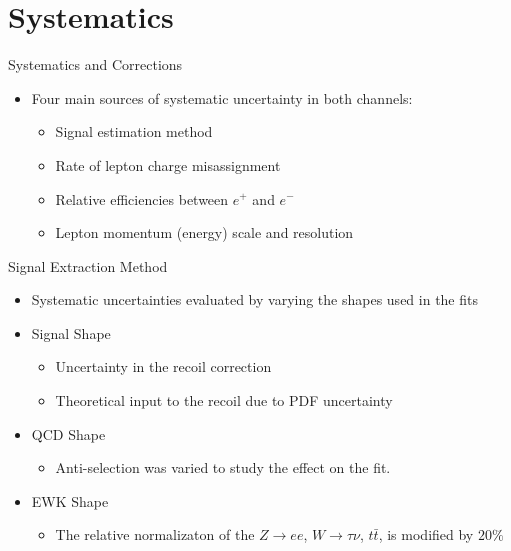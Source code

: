 \documentclass[t, 8pt]{beamer}
\begin{document}
\section{Systematics}

\begin{frame}{Systematics and Corrections}
  \begin{itemize}
    \item Four main sources of systematic uncertainty in both channels:
    \begin{itemize}
      \item Signal estimation method
      \item Rate of lepton charge misassignment
      \item Relative efficiencies between $e^{+}$ and $e^{-}$
      \item Lepton momentum (energy) scale and resolution
    \end{itemize}
  \end{itemize}
\end{frame}

\begin{frame}{Signal Extraction Method}
  \begin{itemize}
    \item Systematic uncertainties evaluated by varying the shapes used in the fits
    \item Signal Shape
    \begin{itemize}
      \item Uncertainty in the recoil correction
      \item Theoretical input to the recoil due to PDF uncertainty
    \end{itemize}
    \item QCD Shape
    \begin{itemize}
      \item Anti-selection was varied to study the effect on the fit. 
    \end{itemize}
    \item EWK Shape
    \begin{itemize}
      \item The relative normalizaton of the $Z \to ee$, $W \to \tau\nu$,
      $t\bar{t}$, is modified by $20\%$
    \end{itemize}
 \end{itemize}
\end{frame}
\end{document}

